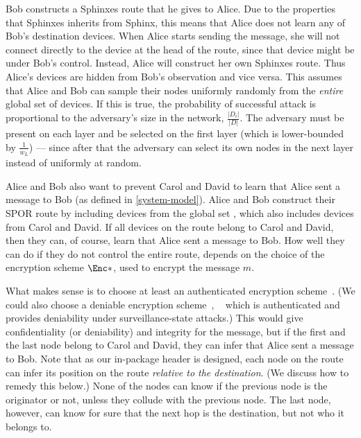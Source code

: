 Bob constructs a Sphinxes route that he gives to Alice.
Due to the properties that Sphinxes inherits from Sphinx, this means that Alice 
does not learn any of Bob's destination devices.
When Alice starts sending the message, she will not connect directly to the 
device at the head of the route, since that device might be under Bob's 
control.
Instead, Alice will construct her own Sphinxes route.
Thus Alice's devices are hidden from Bob's observation and vice versa.
This assumes that Alice and Bob can sample their nodes uniformly randomly from 
the \emph{entire} global set of devices.
If this is true, the probability of successful attack is proportional to the 
adversary's size in the network, \ie \(\frac{|D_i|}{|D|}\).
The adversary must be present on each layer and be selected on the first layer 
(which is lower-bounded by \(\frac{1}{w_L}\)) --- since after that the 
adversary can select its own nodes in the next layer instead of uniformly at 
random.

Alice and Bob also want to prevent Carol and David to learn that Alice sent a 
message to Bob (as defined in \cref{system-model}).
Alice and Bob construct their \ac{SPOR} route by including devices from the 
global set %
, which also includes devices from Carol and David.
If all devices on the route belong to Carol and David, then they can, of course, 
learn that Alice sent a message to Bob.
How well they can do if they do not control the entire route, depends on the 
choice of the encryption scheme \(\Enc*\), used to encrypt the message \(m\). 

What makes sense is to choose at least an authenticated encryption 
scheme~\cite{AuthEncryption}.
(We could also choose a deniable encryption scheme~\cite{DeniableEncryption}, 
\eg~\cite{OTPKX} which is authenticated and provides deniability under
surveillance-state attacks.) %
This would give confidentiality (or deniability) and integrity for the message, 
but if the first and the last node belong to Carol and David, they can infer 
that Alice sent a message to Bob.
Note that as our in-package header is designed, each node on the route can infer 
its position on the route \emph{relative to the destination}.
(We discuss how to remedy this below.)
None of the nodes can know if the previous node is the originator or not, unless 
they collude with the previous node.
The last node, however, can know for sure that the next hop is the destination, 
but not who it belongs to.

